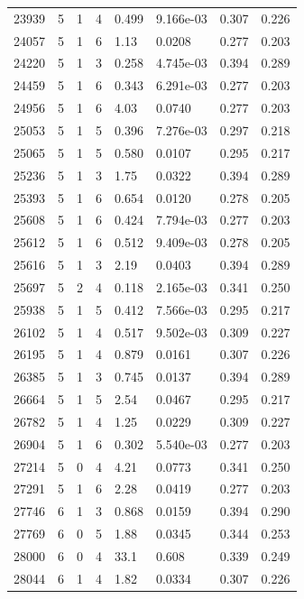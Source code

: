 \documentclass[preview]{standalone}
\begin{document}
{{{\begin{tabular}{L{1.2cm}C{1.2cm} C{0.3cm}C{0.5cm} C{1.4cm}C{1.4cm} C{1.4cm}C{1.4cm}}
  23939  &     5  & 1     &  4 &  0.499  & 9.166e-03  & 0.307 &  0.226   \\ 
  24057  &     5  & 1     &  6 &  1.13  & 0.0208  & 0.277 &  0.203   \\ 
  24220  &     5  & 1     &  3 &  0.258  & 4.745e-03  & 0.394 &  0.289   \\ 
  24459  &     5  & 1     &  6 &  0.343  & 6.291e-03  & 0.277 &  0.203   \\ 
  24956  &     5  & 1     &  6 &  4.03  & 0.0740  & 0.277 &  0.203   \\ 
  25053  &     5  & 1     &  5 &  0.396  & 7.276e-03  & 0.297 &  0.218   \\ 
  25065  &     5  & 1     &  5 &  0.580  & 0.0107  & 0.295 &  0.217   \\ 
  25236  &     5  & 1     &  3 &  1.75  & 0.0322  & 0.394 &  0.289   \\ 
  25393  &     5  & 1     &  6 &  0.654  & 0.0120  & 0.278 &  0.205   \\ 
  25608  &     5  & 1     &  6 &  0.424  & 7.794e-03  & 0.277 &  0.203   \\ 
  25612  &     5  & 1     &  6 &  0.512  & 9.409e-03  & 0.278 &  0.205   \\ 
  25616  &     5  & 1     &  3 &  2.19  & 0.0403  & 0.394 &  0.289   \\ 
  25697  &     5  & 2     &  4 &  0.118  & 2.165e-03  & 0.341 &  0.250   \\ 
  25938  &     5  & 1     &  5 &  0.412  & 7.566e-03  & 0.295 &  0.217   \\ 
  26102  &     5  & 1     &  4 &  0.517  & 9.502e-03  & 0.309 &  0.227   \\ 
  26195  &     5  & 1     &  4 &  0.879  & 0.0161  & 0.307 &  0.226   \\ 
  26385  &     5  & 1     &  3 &  0.745  & 0.0137  & 0.394 &  0.289   \\ 
  26664  &     5  & 1     &  5 &  2.54  & 0.0467  & 0.295 &  0.217   \\ 
  26782  &     5  & 1     &  4 &  1.25  & 0.0229  & 0.309 &  0.227   \\ 
  26904  &     5  & 1     &  6 &  0.302  & 5.540e-03  & 0.277 &  0.203   \\ 
  27214  &     5  & 0     &  4 &  4.21  & 0.0773  & 0.341 &  0.250   \\ 
  27291  &     5  & 1     &  6 &  2.28  & 0.0419  & 0.277 &  0.203   \\ 
  27746  &     6  & 1     &  3 &  0.868  & 0.0159  & 0.394 &  0.290   \\ 
  27769  &     6  & 0     &  5 &  1.88  & 0.0345  & 0.344 &  0.253   \\ 
  28000  &     6  & 0     &  4 &  33.1  & 0.608  & 0.339 &  0.249   \\ 
  28044  &     6  & 1     &  4 &  1.82  & 0.0334  & 0.307 &  0.226   \\ 
\hline 
\end{tabular} 

}}}
\end{document}
